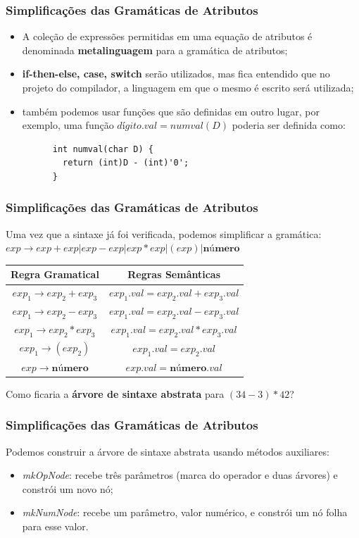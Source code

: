 \documentclass[table]{beamer}
\begin{document}
\begin{frame}[fragile]
   \frametitle{Simplificações das Gramáticas de Atributos}
   \begin{itemize}
      \item A coleção de expressões permitidas em uma equação de atributos é denominada \textbf{metalinguagem} para a gramática de atributos;
      \item \textbf{if-then-else, case, switch} serão utilizados, mas fica entendido que no projeto do compilador, a linguagem em que o mesmo é escrito será utilizada;
      \item também podemos usar funções que são definidas em outro lugar, por exemplo, uma função $\textit{dígito}.val = numval(D)$ poderia ser definida como:
      \begin{verbatim}
      int numval(char D) {
        return (int)D - (int)'0'; 
      }
      \end{verbatim}
   \end{itemize}
\end{frame}

\begin{frame}
   \frametitle{Simplificações das Gramáticas de Atributos}
   Uma vez que a sintaxe já foi verificada, podemos simplificar a gramática: \\
   $exp\to exp + exp | exp - exp | exp * exp | (exp) | \textbf{número}$ \\
   \begin{table}
      \begin{tabular}{cc}
      Regra Gramatical & Regras Semânticas \\
      \hline 
      $exp_{1}\to exp_{2} + exp_{3}$ & $exp_{1}.val = exp_{2}.val + exp_{3}.val $ \\
      $exp_{1}\to exp_{2} - exp_{3}$ & $exp_{1}.val = exp_{2}.val - exp_{3}.val $ \\
      $exp_{1}\to exp_{2} * exp_{3}$ & $exp_{1}.val = exp_{2}.val * exp_{3}.val $ \\
      $exp_{1}\to (exp_{2})$         & $exp_{1}.val = exp_{2}.val $ \\
      $exp\to \textbf{número}$   & $exp.val = \textbf{número}.val $ \\
      \hline
      \end{tabular}
   \end{table}
   Como ficaria a \textbf{árvore de sintaxe abstrata} para $(34-3)*42$?
\end{frame}

\begin{frame}
   \frametitle{Simplificações das Gramáticas de Atributos}
   Podemos construir a árvore de sintaxe abstrata usando métodos auxiliares:
   \begin{itemize}
      \item \textit{mkOpNode}: recebe três parâmetros (marca do operador e duas árvores) e constrói um novo nó;
      \item \textit{mkNumNode}: recebe um parâmetro, valor numérico, e constrói um nó folha para esse valor.
   \end{itemize}
\end{frame}
\end{document}
